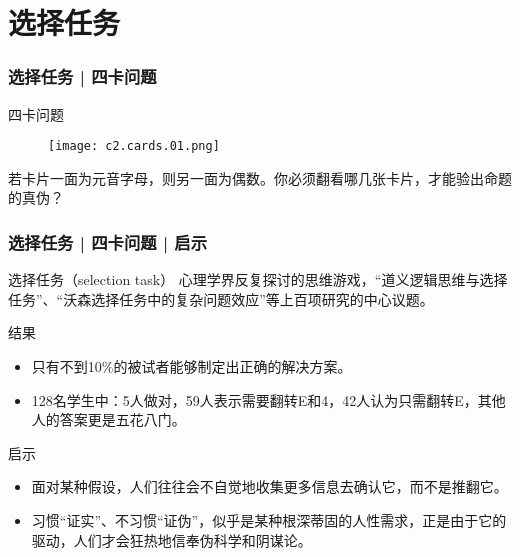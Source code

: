 \section{选择任务}
\begin{frame}
  \frametitle{选择任务 | 四卡问题}
  \begin{block}{四卡问题}
    \begin{figure}
      \centering
      \texttt{[image: c2.cards.01.png]}
    \end{figure}
    若卡片一面为元音字母，则另一面为偶数。你必须翻看哪几张卡片，才能验出命题的真伪？
  \end{block}
\end{frame}

\begin{frame}
  \frametitle{选择任务 | 四卡问题 | 启示}
  \begin{block}{选择任务（selection task）}
 心理学界反复探讨的思维游戏，“道义逻辑思维与选择任务”、“沃森选择任务中的复杂问题效应”等上百项研究的中心议题。
  \end{block}
  \pause
  \begin{block}{结果}
    \begin{itemize}
      \item 只有不到10\%的被试者能够制定出正确的解决方案。
      \item 128名学生中：5人做对，59人表示需要翻转E和4，42人认为只需翻转E，其他人的答案更是五花八门。
    \end{itemize}
  \end{block}
  \pause
  \begin{block}{启示}
    \begin{itemize}
      \item 面对某种假设，人们往往会不自觉地收集更多信息去确认它，而不是推翻它。
      \item 习惯“证实”、不习惯“证伪”，似乎是某种根深蒂固的人性需求，正是由于它的驱动，人们才会狂热地信奉伪科学和阴谋论。
    \end{itemize}
  \end{block}
\end{frame}

